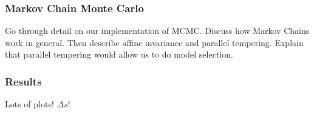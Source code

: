   \subsubsection{Markov Chain Monte Carlo}
    Go through detail on our implementation of MCMC. Discuss how Markov Chains
    work in general. Then describe affine invariance and parallel tempering.
    Explain that parallel tempering would allow us to do model selection.
  \subsubsection{Results}
    Lots of plots! $\Delta s$!



